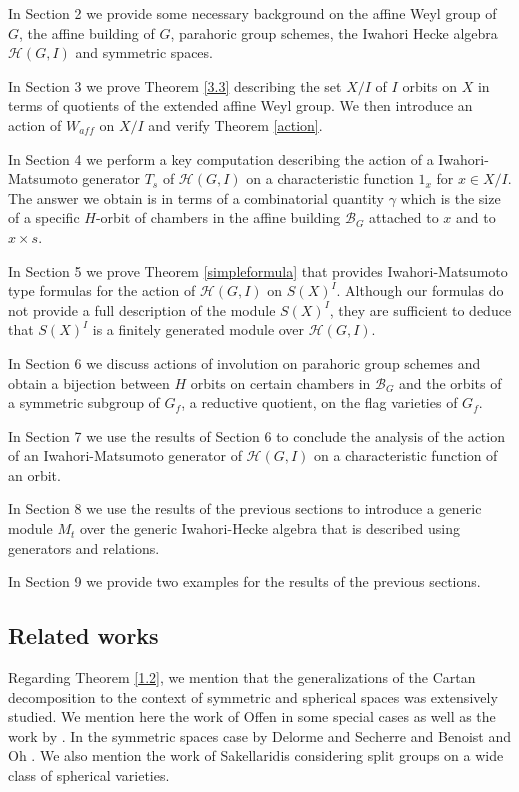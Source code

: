\documentclass[12pt]{article}
\newcommand{\B}{\mathcal{B}}
\newcommand{\<}{\langle}
\renewcommand{\>}{\rangle}
\theoremstyle{plain}
\theoremstyle{definition}
\begin{document}
In Section 2 we provide some necessary background on the affine Weyl group of $G$, the affine building of $G$, parahoric group schemes, the Iwahori Hecke algebra $\mathcal{H}(G,I)$ and symmetric spaces.

In Section 3 we prove Theorem \ref{3.3} describing the set $X/I$ of $I$ orbits on $X$ in terms of quotients of the extended affine Weyl group. We then introduce an action of $W_{aff}$ on $X/I$ and verify Theorem \ref{action}.

In Section 4 we perform a key computation describing the action of a Iwahori-Matsumoto generator $T_{s}$ of $\mathcal{H}(G,I)$ on a characteristic function $1_{x}$ for $x \in X/I$. The answer we obtain is in terms of a combinatorial quantity $\gamma$ which is the size of a specific $H$-orbit of chambers in the affine building $\B_G$ attached to $x$ and to $x \times s$.

In Section 5 we prove Theorem \ref{simpleformula} that provides Iwahori-Matsumoto type formulas for the action of $\mathcal{H}(G,I)$ on $S(X)^I$. Although our formulas do not provide a full description of the module $S(X)^I$, they are sufficient to deduce that $S(X)^I$ is a finitely generated module over $\mathcal{H}(G,I)$. 

In Section 6 we discuss actions of involution on parahoric group schemes and obtain a bijection between $H$ orbits on certain chambers in $\B_G$ and the orbits of a symmetric subgroup of $G_f$, a reductive quotient, on the flag varieties of $G_f$. 

In Section 7 we use the results of Section 6 to conclude the analysis of the action of an Iwahori-Matsumoto generator of $\mathcal{H}(G,I)$ on a characteristic function of an orbit.

In Section 8 we use the results of the previous sections to introduce a generic module $M_{t}$ over the generic Iwahori-Hecke algebra that is described using generators and relations.

In Section 9 we provide two examples for the results of the previous sections. 



\subsection{Related works}
Regarding Theorem \ref{1.2}, we mention that the generalizations of the Cartan decomposition 
to the context of symmetric and spherical spaces was extensively studied. We mention here the work \cite{Off04} of Offen in some special cases as well as the work by \cite{Mao-Rallis09}. In the symmetric spaces case by Delorme and Secherre
 \cite{delorm} and Benoist and Oh \cite{polar_decomposition}.  We also mention the work \cite{Sak12} of Sakellaridis considering split groups on a wide class of spherical varieties.  
 
\end{document}
